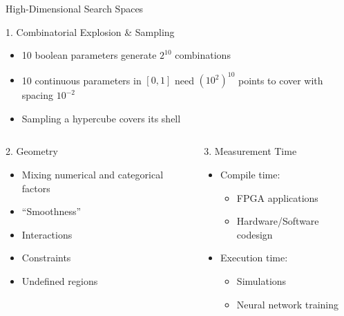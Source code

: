 \documentclass[10pt, compress, aspectratio=169, xcolor={table,usenames,dvipsnames}]{beamer}
\begin{document}
\begin{frame}[label={sec:org0119887}]{High-Dimensional Search Spaces}
\begin{block}{1. \alert{Combinatorial Explosion \& Sampling}}
\begin{itemize}
\item 10 boolean parameters generate \(2^{10}\) combinations
\item 10 continuous parameters in \([0, 1]\)  need \((10^{2})^{10}\) points to cover with
spacing \(10^{-2}\)
\item Sampling a hypercube covers its shell
\end{itemize}
\end{block}

\begin{columns}
\begin{column}{0.5\columnwidth}
\begin{block}{2. \alert{Geometry}}
\begin{itemize}
\item Mixing numerical and categorical factors
\item ``Smoothness''
\item Interactions
\item Constraints
\item Undefined regions
\end{itemize}
\end{block}
\end{column}

\begin{column}{0.5\columnwidth}
\begin{block}{3. \alert{Measurement Time}}
\begin{itemize}
\item Compile time:
\begin{itemize}
\item FPGA applications
\item Hardware/Software codesign
\end{itemize}
\item Execution time:
\begin{itemize}
\item Simulations
\item Neural network training
\end{itemize}
\end{itemize}
\end{block}
\end{column}
\end{columns}
\end{frame}
\end{document}
